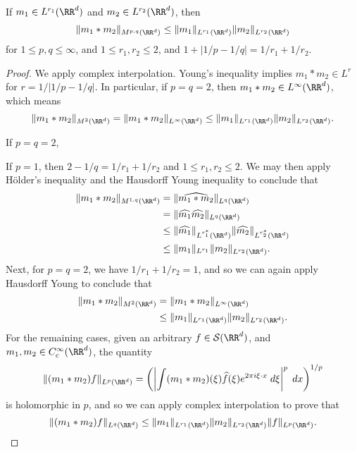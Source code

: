 \begin{lemma}
    If $m_1 \in L^{r_1}(\RR^d)$ and $m_2 \in L^{r_2}(\RR^d)$, then
    \[ \| m_1 * m_2 \|_{M^{p,q}(\RR^d)} \leq \| m_1 \|_{L^{r_1}(\RR^d)} \| m_2 \|_{L^{r_2}(\RR^d)} \]
    for $1 \leq p,q \leq \infty$, and $1 \leq r_1,r_2 \leq 2$, and $1 + |1/p - 1/q| = 1/r_1 + 1/r_2$.
\end{lemma}
\begin{proof}
    We apply complex interpolation. Young's inequality implies $m_1 * m_2 \in L^r$ for $r = 1/|1/p - 1/q|$. In particular, if $p = q = 2$, then $m_1 * m_2 \in L^\infty(\RR^d)$, which means
    \[ \| m_1 * m_2 \|_{M^2(\RR^d)} = \| m_1 * m_2 \|_{L^\infty(\RR^d)} \leq \| m_1 \|_{L^{r_1}(\RR^d)} \| m_2 \|_{L^{r_2}(\RR^d)}. \]

    If $p = q = 2$,


    If $p = 1$, then $2 - 1/q = 1/r_1 + 1/r_2$ and $1 \leq r_1,r_2 \leq 2$. We may then apply H\"{o}lder's inequality and the Hausdorff Young inequality to conclude that
    \begin{align*}
        \| m_1 * m_2 \|_{M^{1,q}(\RR^d)} &= \| \widehat{m_1 * m_2} \|_{L^q(\RR^d)}\\
        &= \| \widehat{m_1} \widehat{m_2} \|_{L^q(\RR^d)}\\
        &\leq \| \widehat{m_1} \|_{L^{r_1^*}(\RR^d)} \| \widehat{m_2} \|_{L^{r_2^*}(\RR^d)}\\
        &\leq \| m_1 \|_{L^{r_1}} \| m_2 \|_{L^{r_2}(\RR^d)}.
    \end{align*}
    Next, for $p = q = 2$, we have $1/r_1 + 1/r_2 = 1$, and so we can again apply Hausdorff Young to conclude that
    \begin{align*}
        \| m_1 * m_2 \|_{M^2(\RR^d)} &= \| m_1 * m_2 \|_{L^\infty(\RR^d)}\\
        &\leq \| m_1 \|_{L^{r_1}(\RR^d)} \| m_2 \|_{L^{r_2}(\RR^d)}.
    \end{align*}
    For the remaining cases, given an arbitrary $f \in \mathcal{S}(\RR^d)$, and $m_1, m_2 \in C_c^\infty(\RR^d)$, the quantity
    \[ \| (m_1 * m_2) f \|_{L^p(\RR^d)} = \left( \left| \int (m_1 * m_2)(\xi) \widehat{f}(\xi) e^{2 \pi i \xi \cdot x}\; d\xi \right|^p\; dx  \right)^{1/p} \]
    is holomorphic in $p$, and so we can apply complex interpolation to prove that
    \[ \| (m_1 * m_2) f \|_{L^q(\RR^d)} \leq \| m_1 \|_{L^{r_1}(\RR^d)} \| m_2 \|_{L^{r_2}(\RR^d)} \| f \|_{L^p(\RR^d)}. \qedhere \]
\end{proof}

